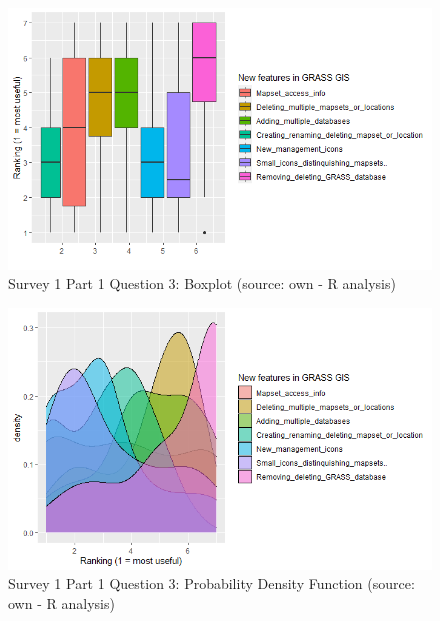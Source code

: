 \documentclass[a4paper,10pt,twoside]{article}
\begin{document}
\vspace{0.3cm}
\begin{figure}[hbt!] 
\begin{center}
\includegraphics[width=15.5cm]{../surveys/analyzed_data/survey1_part1_question3_boxplot_r.png} 
\caption[Survey 1 Part 1 Question 3: Boxplot]{Survey 1 Part 1 Question 3: Boxplot (source: own - R analysis)}
\label{fig:survey1_part1_question3_boxplot_r}
\end{center}
\end{figure}

\vspace{0.3cm}
\begin{figure}[hbt!] 
\begin{center}
\includegraphics[width=15.5cm]{../surveys/analyzed_data/survey1_part1_question3_pdf.png} 
\caption[Survey 1 Part 1 Question 3: Probability Density Function]{Survey 1 Part 1 Question 3: Probability Density Function (source: own - R analysis)}
\label{fig:survey1_part1_question3_pdf}
\end{center}
\end{figure}
\end{document}
